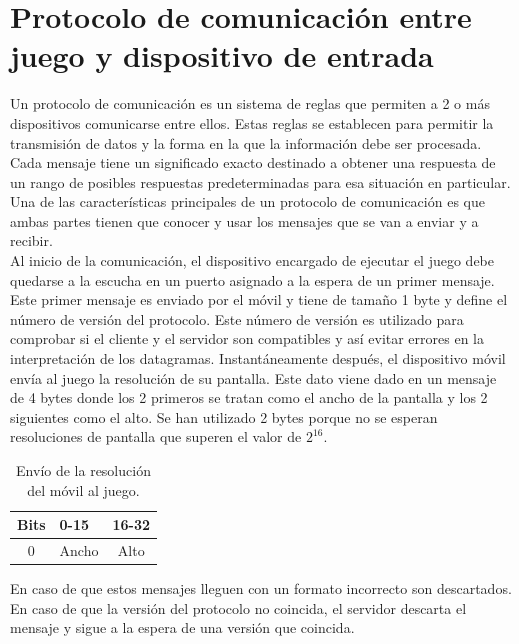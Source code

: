 \section{Protocolo de comunicaci\'on entre juego y dispositivo de entrada}

Un protocolo de comunicaci\'on es un sistema de reglas que permiten a 2 o m\'as dispositivos comunicarse entre ellos. Estas reglas se establecen para permitir la transmisi\'on de datos y la forma en la que la informaci\'on debe ser procesada. Cada mensaje tiene un significado exacto destinado a obtener una respuesta de un rango de posibles respuestas predeterminadas para esa situaci\'on en particular. Una de las caracter\'isticas principales de un protocolo de comunicaci\'on es que ambas partes tienen que conocer y usar los mensajes que se van a enviar y a recibir. \\

Al inicio de la comunicaci\'on, el dispositivo encargado de ejecutar el juego debe quedarse a la escucha en un puerto asignado a la espera de un primer mensaje. Este primer mensaje es enviado por el m\'ovil y tiene de tama\~no 1 byte y define el n\'umero de versi\'on del protocolo. Este n\'umero de versi\'on es utilizado para comprobar si el cliente y el servidor son compatibles y as\'i evitar errores en la interpretaci\'on de los datagramas. Instant\'aneamente despu\'es, el dispositivo m\'ovil env\'ia al juego la resoluci\'on de su pantalla. Este dato viene dado en un mensaje de 4 bytes donde los 2 primeros se tratan como el ancho de la pantalla y los 2 siguientes como el alto. Se  han utilizado 2 bytes porque no se esperan resoluciones de pantalla que superen el valor de $2^{16}$. \\

\begin{table}[h!]
\centering
\begin{tabular}{|l|l|l|} 
\hline
Bits                    & 0-15                   & 16-32                   \\
\hline
\multicolumn{1}{|c|}{0} & \multicolumn{1}{c|}{Ancho} & \multicolumn{1}{c|}{Alto}  \\
\hline
\end{tabular}
\caption{Env\'io de la resoluci\'on del m\'ovil al juego.}
\label{table:1}
\end{table}

En caso de que estos mensajes lleguen con un formato incorrecto son descartados. En caso de que la versi\'on del protocolo no coincida, el servidor descarta el mensaje y sigue a la espera de una versi\'on que coincida.\\

